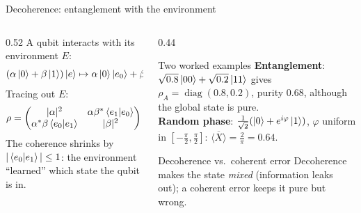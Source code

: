 \documentclass[aspectratio=169,11pt]{beamer}
\begin{document}
\begin{frame}[label=fDecoh]{Decoherence: entanglement with the environment}
  \begin{columns}[T]
    \begin{column}{0.52\textwidth}
      \small
      A qubit interacts with its environment $E$:
      \[ (\alpha\ket0 + \beta\ket1)\ket{e} \mapsto \alpha\ket0\ket{e_0} + \beta\ket1\ket{e_1}. \]
      Tracing out $E$:
      \[ \rho = \begin{pmatrix}|\alpha|^2 & \alpha\beta^*\braket{e_1|e_0}\\ \alpha^*\beta\braket{e_0|e_1} & |\beta|^2\end{pmatrix}. \]
      The coherence shrinks by $|\braket{e_0|e_1}| \le 1$: the environment ``learned'' which state the qubit is in.
    \end{column}
    \begin{column}{0.44\textwidth}
      \begin{exampleblock}{Two worked examples}
        \scriptsize
        \textbf{Entanglement}: $\sqrt{0.8}\ket{00} + \sqrt{0.2}\ket{11}$ gives $\rho_A = \operatorname{diag}(0.8, 0.2)$, purity $0.68$, although the
        global state is pure.\\[3pt]
        \textbf{Random phase}: $\frac{1}{\sqrt2}(\ket0 + e^{i\varphi}\ket1)$, $\varphi$ uniform in $[-\frac\pi2, \frac\pi2]$: $\overline{\langle X\rangle} = \frac2\pi = 0.64$.
      \end{exampleblock}
      \begin{block}{Decoherence vs.\ coherent error}
        \scriptsize Decoherence makes the state \emph{mixed} (information leaks out); a coherent error keeps it pure but wrong.
      \end{block}
    \end{column}
  \end{columns}
\end{frame}
\end{document}
